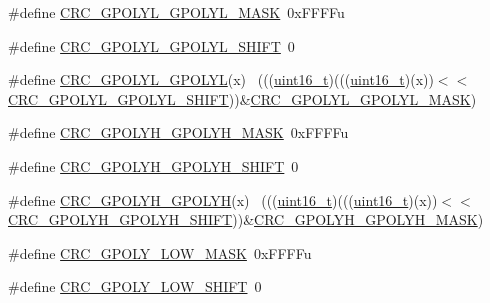 \begin{DoxyCompactItemize}
\item 
\#define \hyperlink{group___c_r_c___register___masks_ga7512a0f84b048e7a54207f9a7e619494}{C\+R\+C\+\_\+\+G\+P\+O\+L\+Y\+L\+\_\+\+G\+P\+O\+L\+Y\+L\+\_\+\+M\+A\+SK}~0x\+F\+F\+F\+Fu
\item 
\#define \hyperlink{group___c_r_c___register___masks_gaf4e5ed1d1478c1a6c8c5681e2b1d24aa}{C\+R\+C\+\_\+\+G\+P\+O\+L\+Y\+L\+\_\+\+G\+P\+O\+L\+Y\+L\+\_\+\+S\+H\+I\+FT}~0
\item 
\#define \hyperlink{group___c_r_c___register___masks_ga9c1eb3a492719fa1461f3bc3d2593462}{C\+R\+C\+\_\+\+G\+P\+O\+L\+Y\+L\+\_\+\+G\+P\+O\+L\+YL}(x)                                      ~(((\hyperlink{_p_e___types_8h_a1f1825b69244eb3ad2c7165ddc99c956}{uint16\+\_\+t})(((\hyperlink{_p_e___types_8h_a1f1825b69244eb3ad2c7165ddc99c956}{uint16\+\_\+t})(x))$<$$<$\hyperlink{group___c_r_c___register___masks_gaf4e5ed1d1478c1a6c8c5681e2b1d24aa}{C\+R\+C\+\_\+\+G\+P\+O\+L\+Y\+L\+\_\+\+G\+P\+O\+L\+Y\+L\+\_\+\+S\+H\+I\+FT}))\&\hyperlink{group___c_r_c___register___masks_ga7512a0f84b048e7a54207f9a7e619494}{C\+R\+C\+\_\+\+G\+P\+O\+L\+Y\+L\+\_\+\+G\+P\+O\+L\+Y\+L\+\_\+\+M\+A\+SK})
\item 
\#define \hyperlink{group___c_r_c___register___masks_ga15ab1d296a857eebfbb3e5894ddd9302}{C\+R\+C\+\_\+\+G\+P\+O\+L\+Y\+H\+\_\+\+G\+P\+O\+L\+Y\+H\+\_\+\+M\+A\+SK}~0x\+F\+F\+F\+Fu
\item 
\#define \hyperlink{group___c_r_c___register___masks_ga62fa126178d7137b39b75ad2d63edae9}{C\+R\+C\+\_\+\+G\+P\+O\+L\+Y\+H\+\_\+\+G\+P\+O\+L\+Y\+H\+\_\+\+S\+H\+I\+FT}~0
\item 
\#define \hyperlink{group___c_r_c___register___masks_ga7bc7d87ea6686671ac9777ae843e18d3}{C\+R\+C\+\_\+\+G\+P\+O\+L\+Y\+H\+\_\+\+G\+P\+O\+L\+YH}(x)                                      ~(((\hyperlink{_p_e___types_8h_a1f1825b69244eb3ad2c7165ddc99c956}{uint16\+\_\+t})(((\hyperlink{_p_e___types_8h_a1f1825b69244eb3ad2c7165ddc99c956}{uint16\+\_\+t})(x))$<$$<$\hyperlink{group___c_r_c___register___masks_ga62fa126178d7137b39b75ad2d63edae9}{C\+R\+C\+\_\+\+G\+P\+O\+L\+Y\+H\+\_\+\+G\+P\+O\+L\+Y\+H\+\_\+\+S\+H\+I\+FT}))\&\hyperlink{group___c_r_c___register___masks_ga15ab1d296a857eebfbb3e5894ddd9302}{C\+R\+C\+\_\+\+G\+P\+O\+L\+Y\+H\+\_\+\+G\+P\+O\+L\+Y\+H\+\_\+\+M\+A\+SK})
\item 
\#define \hyperlink{group___c_r_c___register___masks_ga861d4f6f458051a63a7b01e6e5d8794b}{C\+R\+C\+\_\+\+G\+P\+O\+L\+Y\+\_\+\+L\+O\+W\+\_\+\+M\+A\+SK}~0x\+F\+F\+F\+Fu
\item 
\#define \hyperlink{group___c_r_c___register___masks_ga3830f95399bd5190027aaf00f307d10b}{C\+R\+C\+\_\+\+G\+P\+O\+L\+Y\+\_\+\+L\+O\+W\+\_\+\+S\+H\+I\+FT}~0

\end{DoxyCompactItemize}
